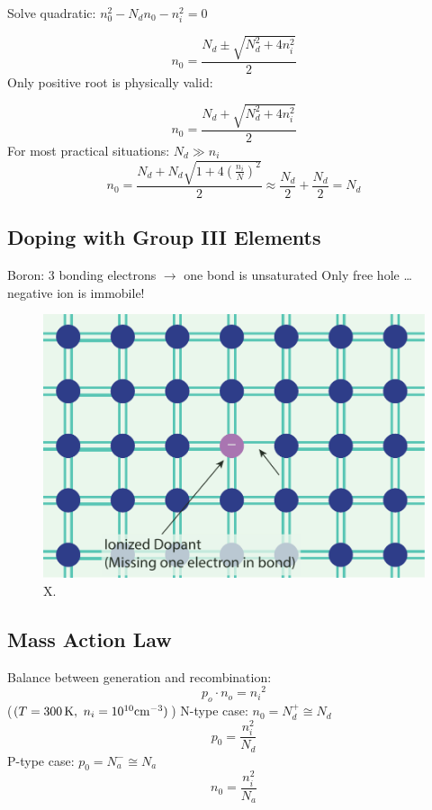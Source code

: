   
 Solve quadratic:  $n_0^2 - {N_d}{n_0} - n_i^2 = 0$

\begin{equation}
	{n_0} = \frac{{{N_d} \pm \sqrt {N_d^2 + 4n_i^2} }}{2}
\end{equation}
 Only positive root is physically valid:

\begin{equation}
	{n_0} = \frac{{{N_d} + \sqrt {N_d^2 + 4n_i^2} }}{2}
\end{equation}
 For most practical situations:  ${N_d} \gg {n_i}$
\begin{equation}
{n_0} = \frac{{{N_d} + {N_d}\sqrt {1 + 4{{\left( {\frac{{{n_i}}}{N}} \right)}^2}} }}{2} \approx \frac{{{N_d}}}{2} + \frac{{{N_d}}}{2} = {N_d}
\end{equation}
 





\subsection{Doping with Group III Elements}

 Boron: 3 bonding electrons $\rightarrow$ one bond is unsaturated
 Only free hole … negative ion is immobile!
 

\begin{figure}
\begin{center}
\includegraphics[width=.5\columnwidth]{silicon_dopant_III}
\end{center}
\caption{X. } \label{fig:silicon_dopant_III}
\end{figure}




\subsection{Mass Action Law}  
 Balance between generation and recombination:  
\begin{equation}
	{p_o} \cdot {n_o} = {n_i}^2
\end{equation}  
($(T = 300\,{\rm{K}},\,\,{n_i} = {10^{10}}{\rm{c}}{{\rm{m}}^{ - 3}})$)
 { N-type case: }  ${n_0} = N_d^ +  \cong {N_d}$
\begin{equation}
	p_0 = \frac{n_i^2}{N_d}
\end{equation}
 { P-type case:}  ${p_0} = N_a^ -  \cong {N_a}$  
\begin{equation}
	n_0 = \frac{n_i^2}{N_a}
\end{equation}

